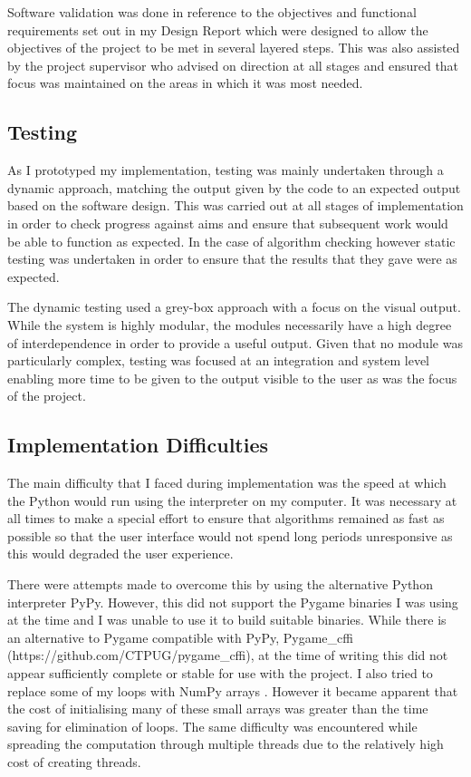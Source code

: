 \documentclass[12pt,a4paper]{article}
\begin{document}
Software validation was done in reference to the objectives and functional requirements set out in my Design Report which were designed to allow the objectives of the project to be met in several layered steps. This was also assisted by the project supervisor who advised on direction at all stages and ensured that focus was maintained on the areas in which it was most needed.

\subsection{Testing}
\noindent
As I prototyped my implementation, testing was mainly undertaken through a dynamic approach, matching the output given by the code to an expected output based on the software design. This was carried out at all stages of implementation in order to check progress against aims and ensure that subsequent work would be able to function as expected. In the case of algorithm checking however static testing was undertaken in order to ensure that the results that they gave were as expected.

The dynamic testing used a grey-box approach with a focus on the visual output. While the system is highly modular, the modules necessarily have a high degree of interdependence in order to provide a useful output. Given that no module was particularly complex, testing was focused at an integration and system level enabling  more time to be given to the output visible to the user as was the focus of the project.

\subsection{Implementation Difficulties}
\noindent
The main difficulty that I faced during implementation was the speed at which the Python would run using the interpreter on my computer. It was necessary at all times to make a special effort to ensure that algorithms remained as fast as possible so that the user interface would not spend long periods unresponsive as this would degraded the user experience.

There were attempts made to overcome this by using the alternative Python interpreter PyPy. However, this did not support the Pygame binaries I was using at the time and I was unable to use it to build suitable binaries. While there is an alternative to Pygame compatible with PyPy, Pygame\_cffi (https://github.com/CTPUG/pygame\_cffi), at the time of writing this did not appear sufficiently complete or stable for use with the project. I also tried to replace some of my loops with NumPy arrays \cite{van2011numpy}. However it became apparent that the cost of initialising many of these small arrays was greater than the time saving for elimination of loops. The same difficulty was encountered while spreading the computation through multiple threads due to the relatively high cost of creating threads.
\end{document}
